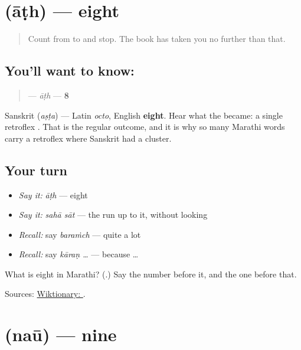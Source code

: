 \section[\texorpdfstring{\mr{आठ} (āṭh)}{आठ (āṭh)}]{ (āṭh) — eight}

\label{lesson:MR-C55-aath}



\begin{quote}
Count from \textbf{} to \textbf{} and stop. The book has taken you no further than that.
\end{quote}

\subsection*{You'll want to know: }
\begin{quote}
\textbf{} — \emph{āṭh} — \textbf{8}
\end{quote}

Sanskrit \textbf{} (\emph{aṣṭa}) — Latin \emph{octo}, English \textbf{eight}. Hear what the \textbf{} became: a single retroflex \textbf{}. That is the regular outcome, and it is why so many Marathi words carry a retroflex where Sanskrit had a cluster.

\subsection*{Your turn}
\begin{itemize}
\raggedright
  \item \emph{Say it:} \emph{āṭh} — eight
  \item \emph{Say it:} \emph{sahā sāt} — the run up to it, without looking
  \item \emph{Recall:} say \emph{baraṁch} — quite a lot
  \item \emph{Recall:} say \emph{kāraṇ …} — because …
\end{itemize}

\begin{tcolorbox}[breakable,colback=teal!4,colframe=teal!35!black,title={Before you move on}]
What is eight in Marathi? (\textbf{}.) Say the number before it, and the one before that.

Sources: \href{https://en.wiktionary.org/wiki/\%E0\%A4\%86\%E0\%A4\%A0}{Wiktionary: }.
\end{tcolorbox}
\section[\texorpdfstring{\mr{नऊ} (naū)}{नऊ (naū)}]{ (naū) — nine}


